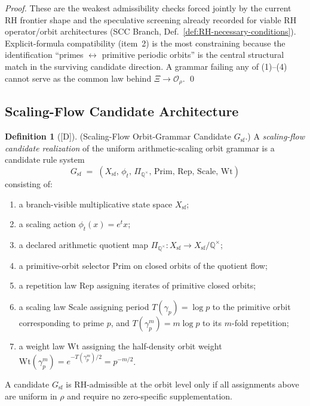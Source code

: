 \documentclass[12pt,oneside]{amsbook}
\theoremstyle{plain}
\theoremstyle{definition}
\newtheorem{definition}[theorem]{Definition}
\theoremstyle{remark}
\newcommand{\status}[1]{\textup{[#1]}}
\begin{document}
\begin{proof}
These are the weakest admissibility checks forced jointly by the
current RH frontier shape and the speculative screening already
recorded for viable RH operator/orbit architectures (SCC Branch,
Def.~\ref{def:RH-necessary-conditions}). Explicit-formula
compatibility (item~2) is the most constraining because the
identification ``primes $\leftrightarrow$ primitive periodic orbits''
is the central structural match in the surviving candidate direction.
A grammar failing any of (1)--(4) cannot serve as the common law
behind $\Xi \to \mathcal{O}_\rho$. \qed
\end{proof}

\subsection{Scaling-Flow Candidate Architecture}

\begin{definition}[\status{D}]\label{def:rh-og-scaling-candidate}
\textup{(Scaling-Flow Orbit-Grammar Candidate $G_{\mathrm{sf}}$.)}
A \emph{scaling-flow candidate realization} of the uniform
arithmetic-scaling orbit grammar is a candidate rule system
\[
 G_{\mathrm{sf}}
 \;=\;
 (X_{\mathrm{sf}},\,\phi_t,\,\Pi_{\mathbb{Q}^\times},\,
 \mathrm{Prim},\,\mathrm{Rep},\,\mathrm{Scale},\,\mathrm{Wt})
\]
consisting of:
\begin{enumerate}[label=\textup{(\arabic*)}]
 \item a branch-visible multiplicative state space $X_{\mathrm{sf}}$;
 \item a scaling action $\phi_t(x) = e^t x$;
 \item a declared arithmetic quotient map
 $\Pi_{\mathbb{Q}^\times}: X_{\mathrm{sf}} \to
 X_{\mathrm{sf}}/\mathbb{Q}^\times$;
 \item a primitive-orbit selector $\mathrm{Prim}$ on closed orbits
 of the quotient flow;
 \item a repetition law $\mathrm{Rep}$ assigning iterates of
 primitive closed orbits;
 \item a scaling law $\mathrm{Scale}$ assigning period
 $T(\gamma_p) = \log p$ to the primitive orbit corresponding to
 prime $p$, and $T(\gamma_p^m) = m\log p$ to its $m$-fold
 repetition;
 \item a weight law $\mathrm{Wt}$ assigning the half-density orbit
 weight $\mathrm{Wt}(\gamma_p^m) = e^{-T(\gamma_p^m)/2} =
 p^{-m/2}$.
\end{enumerate}
A candidate $G_{\mathrm{sf}}$ is RH-admissible at the orbit level
only if all assignments above are uniform in $\rho$ and require no
zero-specific supplementation.
\end{definition}
\end{document}

